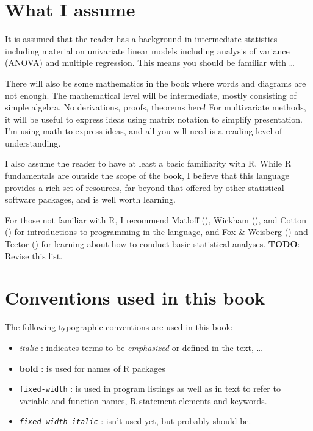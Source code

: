 \documentclass[
  letterpaper,
  10pt,
  krantz2]{krantz}
\begin{document}
\section*{What I assume}\label{what-i-assume}


It is assumed that the reader has a background in intermediate
statistics including material on univariate linear models including
analysis of variance (ANOVA) and multiple regression. This means you
should be familiar with \ldots{}

There will also be some mathematics in the book where words and diagrams
are not enough. The mathematical level will be intermediate, mostly
consisting of simple algebra. No derivations, proofs, theorems here! For
multivariate methods, it will be useful to express ideas using matrix
notation to simplify presentation. I'm using math to express ideas, and
all you will need is a reading-level of understanding.

I also assume the reader to have at least a basic familiarity with R.
While R fundamentals are outside the scope of the book, I believe that
this language provides a rich set of resources, far beyond that offered
by other statistical software packages, and is well worth learning.

For those not familiar with R, I recommend Matloff
(), Wickham
(), and Cotton
() for introductions to programming in
the language, and Fox \& Weisberg
() and Teetor
() for learning about how to conduct
basic statistical analyses. \textbf{TODO}: Revise this list.

\section*{Conventions used in this
book}\label{conventions-used-in-this-book}


The following typographic conventions are used in this book:

\begin{itemize}
\item
  \emph{italic} : indicates terms to be \emph{emphasized} or defined in
  the text, \ldots{}
\item
  \textbf{bold} : is used for names of R packages
\item
  \texttt{fixed-width} : is used in program listings as well as in text
  to refer to variable and function names, R statement elements and
  keywords.
\item
  \emph{\texttt{fixed-width\ italic}} : isn't used yet, but probably
  should be.
\end{itemize}
\end{document}
